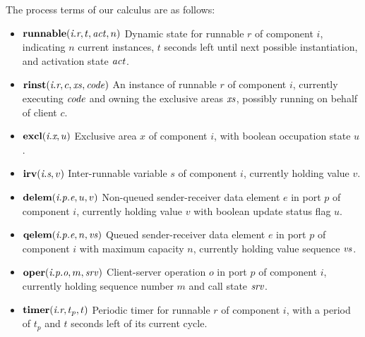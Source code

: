 \documentclass[twocolumn]{article}
\begin{document}
The process terms of our calculus are as follows:
\begin{itemize}
\item $\Trunnable {\Tr r i} t \Act n$  \newline
Dynamic state for runnable $r$ of component $i$, indicating $n$ current instances, $t$ seconds left until next possible instantiation, and activation state $\Act$.
\item $\Trinst {\Tr r i} c \Xs \Code$ \newline
An instance of runnable $r$ of component $i$, currently executing $\Code$ and owning the exclusive areas $\Xs$, possibly running on behalf of client $c$.
\item $\Texcl {\Tx x i} u$ \newline
Exclusive area $x$ of component $i$, with boolean occupation state $u$.
\item $\Tirv {\Ts s i} v$ \newline
Inter-runnable variable $s$ of component $i$, currently holding value $v$.
\item $\Tdelem {\Tep e p i} u v$ \newline
Non-queued sender-receiver data element $e$ in port $p$ of component $i$, currently holding value $v$ with boolean update status flag $u$.
\item $\Tqelem {\Tep e p i} n \Vs$ \newline
Queued sender-receiver data element $e$ in port $p$ of component $i$ with maximum capacity $n$, currently holding value sequence $\Vs$.
\item $\Toper {\Top o p i} m \Srv$ \newline
Client-server operation $o$ in port $p$ of component $i$, currently holding sequence number $m$ and call state $\Srv$.
\item $\Ttimer {\Tr r i} {t_p} t$ \newline
Periodic timer for runnable $r$ of component $i$, with a period of $t_p$ and $t$ seconds left of its current cycle.
\end{itemize}
\end{document}
